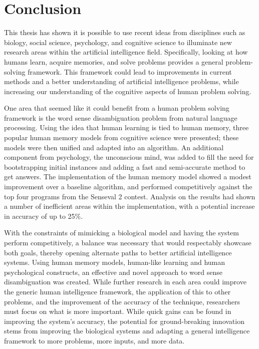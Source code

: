 \chapter{Conclusion}

This thesis has shown it is possible to use recent ideas from disciplines such
as biology, social science, psychology, and cognitive science to illuminate new
research areas within the artificial intelligence field.  Specifically, looking
at how humans learn, acquire memories, and solve problems provides a general
problem-solving framework.  This framework could lead to improvements in current
methods and a better understanding of artificial intelligence problems, while
increasing our understanding of the cognitive aspects of human problem solving.

One area that seemed like it could benefit from a human problem solving
framework is the word sense disambiguation problem from natural language
processing. Using the idea that human learning is tied to human memory, three
popular human memory models from cognitive science were presented; these models
were then unified and adapted into an algorithm.  An additional component from
psychology, the unconscious mind, was added to fill the need for bootstrapping
initial instances and adding a fast and semi-accurate method to get answers. The 
implementation of the human memory model showed a modest improvement over a 
baseline algorithm, and performed competitively against the top four programs 
from the Senseval 2 contest.  Analysis on the results had shown a number of 
inefficient areas within the implementation, with a potential increase in 
accuracy of up to 25\%.

With the constraints of mimicking a biological model and having the system
perform competitively, a balance was necessary that would respectably showcase
both goals, thereby  opening alternate paths to better artificial intelligence
systems. Using human memory models, human-like learning and human psychological
constructs, an effective and novel approach to word sense disambiguation was
created.  While further research in each area could improve the generic human
intelligence framework, the application of this to other problems, and the
improvement of the accuracy of the technique, researchers must focus on what is
more important.  While quick gains can be found in improving the system's
accuracy, the potential for ground-breaking innovation stems from improving the
biological systems and adapting a general intelligence framework to more
problems, more inputs, and more data.

